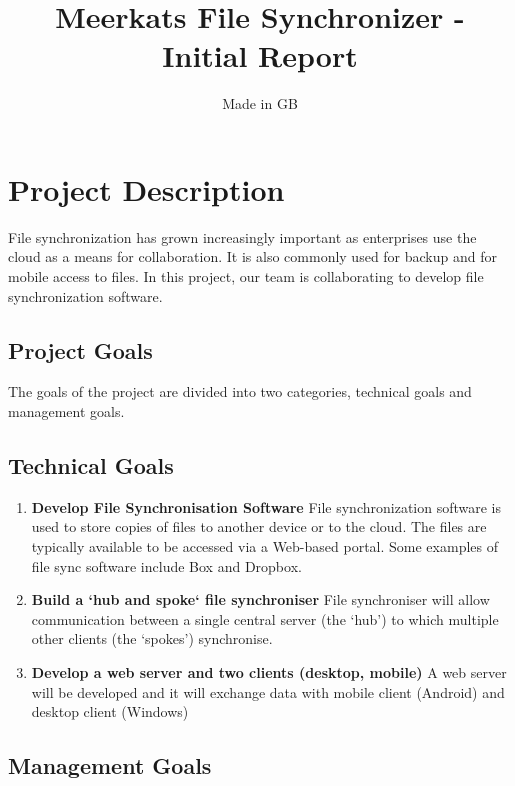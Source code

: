 \documentclass{article}
\title{Meerkats File Synchronizer - Initial Report}
\author{Made in GB}
\date{}
\begin{document}
\maketitle{}


\section{Project Description}

File synchronization has grown increasingly important as enterprises use the cloud as a means for collaboration. It is also commonly used for backup and for mobile access to files. In this project, our team is collaborating to develop file synchronization software.

\subsection{Project Goals}
The goals of the project are divided into two categories, technical goals and management goals.

\subsection{Technical Goals}

\begin{enumerate}
  \item \textbf{Develop File Synchronisation Software} File synchronization software is used to store copies of files to another device or to the cloud. The files are typically available to be accessed via a Web-based portal. Some examples of file sync software include Box and Dropbox.
  \item \textbf{Build a ‘hub and spoke‘ file synchroniser} File synchroniser will allow communication between a single central server (the ‘hub’) to which multiple other clients (the ‘spokes’) synchronise.
  \item \textbf{Develop a web server and two clients (desktop, mobile)} A web server will be developed and it will exchange data with mobile client (Android) and desktop client (Windows)
\end{enumerate}

\subsection{Management Goals}
\end{document}
